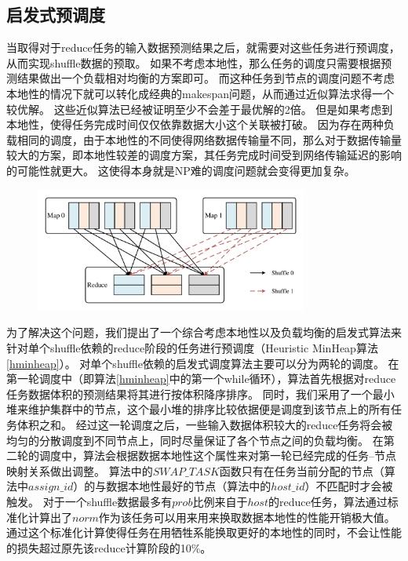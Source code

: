 \subsection{启发式预调度}
\label{subsec:schedule}

当取得对于reduce任务的输入数据预测结果之后，就需要对这些任务进行预调度，从而实现shuffle数据的预取。
如果不考虑本地性，那么任务的调度只需要根据预测结果做出一个负载相对均衡的方案即可。
而这种任务到节点的调度问题不考虑本地性的情况下就可以转化成经典的makespan问题，从而通过近似算法求得一个较优解\cite{approximation}。
这些近似算法已经被证明至少不会差于最优解的2倍。
但是如果考虑到本地性，使得任务完成时间仅仅依靠数据大小这个关联被打破。
因为存在两种负载相同的调度，由于本地性的不同使得网络数据传输量不同，那么对于数据传输量较大的方案，即本地性较差的调度方案，其任务完成时间受到网络传输延迟的影响的可能性就更大。
这使得本身就是NP难的调度问题就会变得更加复杂。

\begin{figure}[!htp]
    \centering
    \includegraphics[width=0.8\textwidth]{../figure/twoshuffles.pdf}
\end{figure}

为了解决这个问题，我们提出了一个综合考虑本地性以及负载均衡的启发式算法来针对单个shuffle依赖的reduce阶段的任务进行预调度（Heuristic MinHeap算法\ref{hminheap}）。
对单个shuffle依赖的启发式调度算法主要可以分为两轮的调度。
在第一轮调度中（即算法\ref{hminheap}中的第一个while循环），算法首先根据对reduce任务数据体积的预测结果将其进行按体积降序排序。
同时，我们采用了一个最小堆来维护集群中的节点，这个最小堆的排序比较依据便是调度到该节点上的所有任务体积之和。
经过这一轮调度之后，一些输入数据体积较大的reduce任务将会被均匀的分散调度到不同节点上，同时尽量保证了各个节点之间的负载均衡。
在第二轮的调度中，算法会根据数据本地性这个属性来对第一轮已经完成的任务--节点映射关系做出调整。
算法中的$SWAP\_TASK$函数只有在任务当前分配的节点（算法中$assign\_id$）的与数据本地性最好的节点（算法中的$host\_id$）不匹配时才会被触发。
对于一个shuffle数据最多有$prob$比例来自于$host$的reduce任务，算法通过标准化计算出了$norm$作为该任务可以用来用来换取数据本地性的性能开销极大值。
通过这个标准化计算使得任务在用牺牲系能换取更好的本地性的同时，不会让性能的损失超过原先该reduce计算阶段的10\%。

